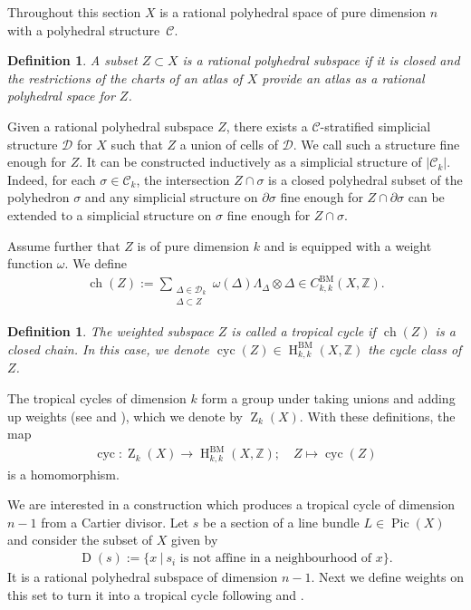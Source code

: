 \documentclass[11pt]{article}
\numberwithin{equation}{numsection}
\newcommand{\ZZ}{{\mathbb Z}}
\newcommand{\Z}{{\mathbb Z}}
\newcommand{\CC}{{\mathcal C}}
\newcommand{\DD}{\mathcal{D}}
\DeclareMathOperator{\Pic}{Pic}
\DeclareMathOperator{\cyc}{cyc}
\DeclareMathOperator{\ch}{ch}
\DeclareMathOperator{\ND}{D}
\DeclareMathOperator{\BM}{BM}
\DeclareMathOperator{\HH}{H}
\DeclareMathOperator{\ZY}{Z}
\newtheorem{defn}[thm]{Definition}
\begin{document}
Throughout this section $X$ is a rational polyhedral space of pure dimension $n$ with a polyhedral structure~$\CC$.

\begin{defn}\label{def:cycle}
A subset $Z \subset X$ is a \emph{rational polyhedral subspace} if it is closed and 
the restrictions of the charts of an atlas of $X$ provide an atlas as a rational polyhedral space for $Z$.
\end{defn}

Given a rational polyhedral subspace $Z$, there exists a $\CC$-stratified simplicial structure $\DD$ 
for $X$ such that $Z$ a union of cells of $\DD$. We call such a structure fine enough for $Z$. 
It can be constructed inductively as a simplicial structure of $|\CC_k|$.
Indeed, for each $\sigma \in \CC_k$, the intersection $Z \cap \sigma$ is a closed polyhedral subset
of the polyhedron $\sigma$ and any simplicial structure on $\partial \sigma$ fine enough for $Z \cap \partial \sigma$
can be extended to a simplicial structure on $\sigma$ fine enough for $Z \cap \sigma$.


Assume further that $Z$ is of pure dimension $k$ and is equipped with a weight function $\omega$.
We define 
\begin{align*}
  \ch(Z) := \sum \limits_{\substack{\Delta \in \DD_{k}  \\  \Delta \subset Z} } \omega(\Delta) \Lambda_\Delta \otimes \Delta \in C^{\BM}_{k,k}(X, \ZZ).
\end{align*}

\begin{defn}
The weighted subspace $Z$ is called a \emph{tropical cycle} if $\ch(Z)$ is a closed chain. In this  case, we 
denote $\cyc(Z) \in \HH_{k,k}^{\BM}(X, \Z)$ the \emph{cycle class} of $Z$.
\end{defn}
 

The tropical cycles of dimension $k$ 
form a group under taking unions and adding up weights
(see \cite[Lemmas 2.14 and 5.15]{AllermannRau} and \cite[Section 7.1]{MikRau}), 
which we denote by $\ZY_k(X)$.
With these definitions, the map
\begin{align*}
\cyc \colon \ZY_k(X) \to \HH_{k,k}^{\BM}(X, \Z);  \quad Z \mapsto \cyc(Z) 
\end{align*}
is a homomorphism. 

We are interested in a construction
which produces a  tropical cycle of dimension $n-1$ from  a Cartier divisor.
Let $s$ be a section of a line bundle $L \in \Pic(X)$ and  consider the subset of $X$ given by
\begin{align*}
\ND(s) :=  \{x \ | \   s_i \text{ is not affine in a neighbourhood of $x$}\}.
\end{align*}
It is a rational polyhedral subspace of dimension $n-1$.
Next we define weights on this set to turn it into a tropical cycle following \cite[Section 3]{AllermannRau} and \cite[Section 5.2]{MikRau}.
\end{document}
